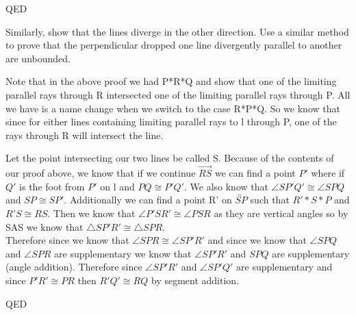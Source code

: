 \documentclass[12pt,letterpaper]{article}
\newcommand{\Proof}{\noindent {\bf Proof: }}
\newcommand{\QED}{\begin{flushright}QED\end{flushright}}
\begin{document}
\QED


\newpage
	Similarly, show that the lines diverge in the other direction.  Use a similar method to prove that the perpendicular dropped one line divergently parallel to another are unbounded. 

\Proof

Note that in the above proof we had P*R*Q and show that one of the limiting parallel rays through R intersected one of the limiting parallel rays through P.  All we have is a name change when we switch to the case R*P*Q.  So we know that since for either lines containing limiting parallel rays to l through P, one of the rays through R will intersect the line.

Let the point intersecting our two lines be called S. Because of the contents of our proof above, we know that if we continue $\overrightarrow{RS}$ we can find a point $P'$ where if $Q'$ is the foot from $P'$ on l and $PQ \cong P'Q'$.  We also know that $\angle SP'Q' \cong \angle SPQ$ and $SP\cong SP'$.  Additionally we can find a point R' on $\overleftrightarrow{SP}$ such that $R'*S*P$  and $R'S \cong RS$.  Then we know that $\angle P'SR' \cong \angle PSR$ as they are vertical angles so by SAS we know that $\triangle SP'R' \cong \triangle SPR$.  \\

Therefore since we know that $\angle SPR \cong \angle SP'R'$ and since we know that $\angle SPQ$ and $\angle SPR$ are supplementary we know that $\angle SP'R'$ and $SPQ$ are supplementary (angle addition). Therefore since $\angle SP'R'$ and $\angle SP'Q'$ are supplementary and since $P'R' \cong PR$ then $R'Q' \cong RQ$ by segment addition.

\QED
\end{document}
